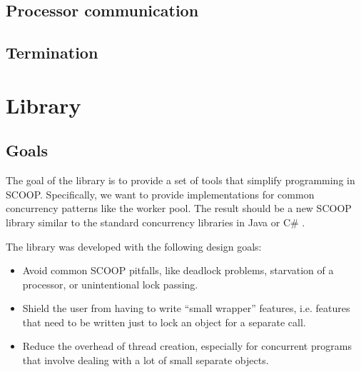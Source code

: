 \documentclass[a4paper,10pt]{report}
\newcommand{\todoref}{\todo{ref}}
\begin{document}

\subsection{Processor communication}


\subsection{Termination}


\section {Library}

 
\subsection{Goals}
\label{sec:goals}

The goal of the library is to provide a set of tools that simplify programming in SCOOP.
Specifically, we want to provide implementations for common concurrency patterns like the worker pool.
The result should be a new SCOOP library similar to the standard concurrency libraries in Java \todoref or C\# \todoref.

The library was developed with the following design goals:

\begin{itemize}
 \item Avoid common SCOOP pitfalls, like deadlock problems, starvation of a processor, or unintentional lock passing.
 \item Shield the user from having to write ``small wrapper'' features, i.e. features that need to be written just to lock an object for a separate call.
 \item Reduce the overhead of thread creation, especially for concurrent programs that involve dealing with a lot of small separate objects.
\end{itemize}
\end{document}
